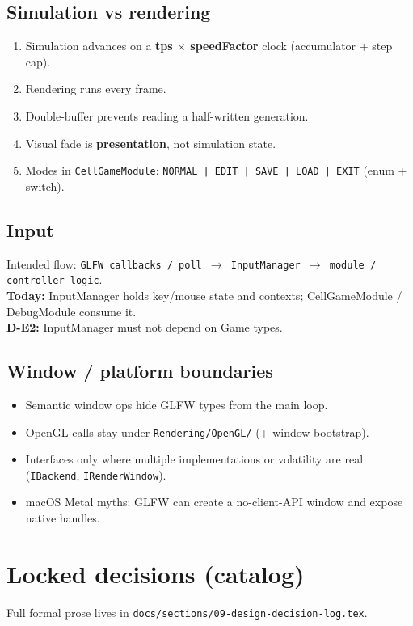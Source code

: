 \documentclass[10pt,a4paper]{article}
\begin{document}
\subsection{Simulation vs rendering}
\begin{enumerate}
    \item Simulation advances on a \textbf{tps $\times$ speedFactor} clock (accumulator + step cap).
    \item Rendering runs every frame.
    \item Double-buffer prevents reading a half-written generation.
    \item Visual fade is \textbf{presentation}, not simulation state.
    \item Modes in \texttt{CellGameModule}: \texttt{NORMAL | EDIT | SAVE | LOAD | EXIT} (enum + switch).
\end{enumerate}

\subsection{Input}
Intended flow: \texttt{GLFW callbacks / poll $\rightarrow$ InputManager $\rightarrow$ module / controller logic}.\\
\textbf{Today:} InputManager holds key/mouse state and contexts; CellGameModule / DebugModule consume it.\\
\textbf{D-E2:} InputManager must not depend on Game types.

\subsection{Window / platform boundaries}
\begin{itemize}
    \item Semantic window ops hide GLFW types from the main loop.
    \item OpenGL calls stay under \texttt{Rendering/OpenGL/} (+ window bootstrap).
    \item Interfaces only where multiple implementations or volatility are real (\texttt{IBackend}, \texttt{IRenderWindow}).
    \item macOS Metal myths: GLFW can create a no-client-API window and expose native handles.
\end{itemize}

\section{Locked decisions (catalog)}
Full formal prose lives in \texttt{docs/sections/09-design-decision-log.tex}.
\end{document}
